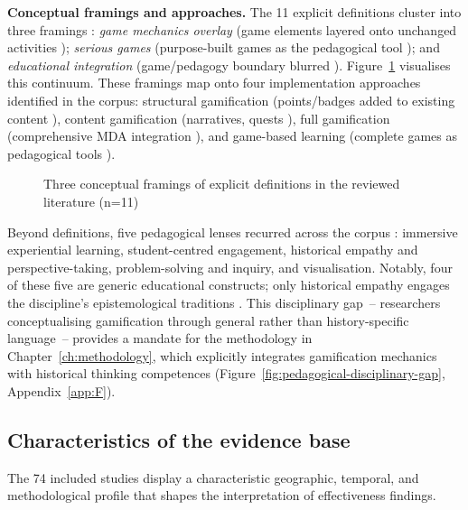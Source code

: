 \textbf{Conceptual framings and approaches.} \label{sec:conceptual-approaches}
The 11 explicit definitions cluster into three framings \cite{KorniienkoSemerikov2024, Titova2025cte}: \textit{game mechanics overlay} (game elements layered onto unchanged activities \cite{Deterding2011}); \textit{serious games} (purpose-built games as the pedagogical tool \cite{42Huffer201581, 41Petersen2023301}); and \textit{educational integration} (game/pedagogy boundary blurred \cite{30Zin2008, 65Razak201139}). Figure~\ref{fig:definitional-framings} visualises this continuum. These framings map onto four implementation approaches identified in the corpus: structural gamification (points/badges added to existing content \cite{Humeniuk2022113}), content gamification (narratives, quests \cite{43ali2021indonesian}), full gamification (comprehensive MDA integration \cite{36Scholz2021, Sailer2017}), and game-based learning (complete games as pedagogical tools \cite{Qian2016, Prensky2001}).

\begin{figure}[!h]
\centering

\caption{Three conceptual framings of explicit definitions in the reviewed literature (n=11)}
\label{fig:definitional-framings}
\end{figure}

Beyond definitions, five pedagogical lenses recurred across the corpus \cite{KorniienkoSemerikov2024}: immersive experiential learning, student-centred engagement, historical empathy and perspective-taking, problem-solving and inquiry, and visualisation. Notably, four of these five are generic educational constructs; only historical empathy engages the discipline's epistemological traditions \cite{Wineburg2001}. This disciplinary gap~-- researchers conceptualising gamification through general rather than history-specific language~-- provides a mandate for the methodology in Chapter~\ref{ch:methodology}, which explicitly integrates gamification mechanics with historical thinking competences (Figure~\ref{fig:pedagogical-disciplinary-gap}, Appendix~\ref{app:F}).

\subsection{Characteristics of the evidence base} \label{sec:evidence-base}

The 74 included studies display a characteristic geographic, temporal, and methodological profile that shapes the interpretation of effectiveness findings.

